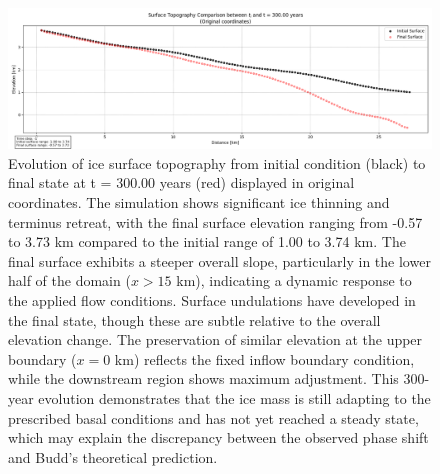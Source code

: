 \begin{figure}
    \includegraphics[scale=0.45]{surfaces_comparison.png}
    \caption{Evolution of ice surface topography from initial condition (black) to final state at t = 300.00 years (red) displayed in original coordinates. The simulation shows significant ice thinning and terminus retreat, with the final surface elevation ranging from -0.57 to 3.73 km compared to the initial range of 1.00 to 3.74 km. The final surface exhibits a steeper overall slope, particularly in the lower half of the domain ($x > 15$ km), indicating a dynamic response to the applied flow conditions. Surface undulations have developed in the final state, though these are subtle relative to the overall elevation change. The preservation of similar elevation at the upper boundary ($x = 0$ km) reflects the fixed inflow boundary condition, while the downstream region shows maximum adjustment. This 300-year evolution demonstrates that the ice mass is still adapting to the prescribed basal conditions and has not yet reached a steady state, which may explain the discrepancy between the observed phase shift and Budd's theoretical prediction.}
    \label{fig:surfaces}
\end{figure}

